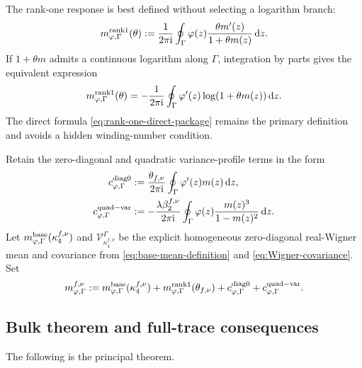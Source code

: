 \documentclass[11pt]{article}
\theoremstyle{definition}
\theoremstyle{remark}
\newcommand{\ii}{\mathrm i}
\newcommand{\dd}{\mathrm d}
\begin{document}
The rank-one response is best defined without selecting a logarithm branch:
\begin{equation}\label{eq:rank-one-direct-package}
 m_{\varphi,\Gamma}^{\rm rank1}(\theta)
 :=\frac{1}{2\pi\ii}
 \oint_\Gamma
 \varphi(z)\frac{\theta m'(z)}{1+\theta m(z)}\,\dd z.
\end{equation}
If \(1+\theta m\) admits a continuous logarithm along \(\Gamma\), integration
by parts gives the equivalent expression
\begin{equation}\label{eq:rank-one-log-package}
 m_{\varphi,\Gamma}^{\rm rank1}(\theta)
 =-\frac{1}{2\pi\ii}
 \oint_\Gamma
 \varphi'(z)\log(1+\theta m(z))\,\dd z.
\end{equation}
The direct formula \eqref{eq:rank-one-direct-package} remains the primary
definition and avoids a hidden winding-number condition.

Retain the zero-diagonal and quadratic variance-profile terms in the form
\begin{align}
 c_{\varphi,\Gamma}^{\rm diag0}
 &:=\frac{\theta_{f,\nu}}{2\pi\ii}
 \oint_\Gamma\varphi'(z)m(z)\,\dd z,
 \label{eq:diag-package}\\
 c_{\varphi,\Gamma}^{\rm quad-var}
 &:=-\frac{\lambda\beta_2^{f,\nu}}{2\pi\ii}
 \oint_\Gamma
 \varphi(z)\frac{m(z)^3}{1-m(z)^2}\,\dd z.
 \label{eq:quad-package}
\end{align}
Let \(m_{\varphi,\Gamma}^{\rm base}(\kappa_4^{f,\nu})\) and
\(\mathcal V_{\kappa_4^{f,\nu}}^\Gamma\) be the explicit homogeneous
zero-diagonal real-Wigner mean and covariance from
\eqref{eq:base-mean-definition} and \eqref{eq:Wigner-covariance}.
Set
\begin{equation}\label{eq:total-mean-package}
 m_{\varphi,\Gamma}^{f,\nu}
 :=m_{\varphi,\Gamma}^{\rm base}(\kappa_4^{f,\nu})
 +m_{\varphi,\Gamma}^{\rm rank1}(\theta_{f,\nu})
 +c_{\varphi,\Gamma}^{\rm diag0}
 +c_{\varphi,\Gamma}^{\rm quad-var}.
\end{equation}

\subsection{Bulk theorem and full-trace consequences}
\label{subsec:bulk-full-results}

The following is the principal theorem.
\end{document}
